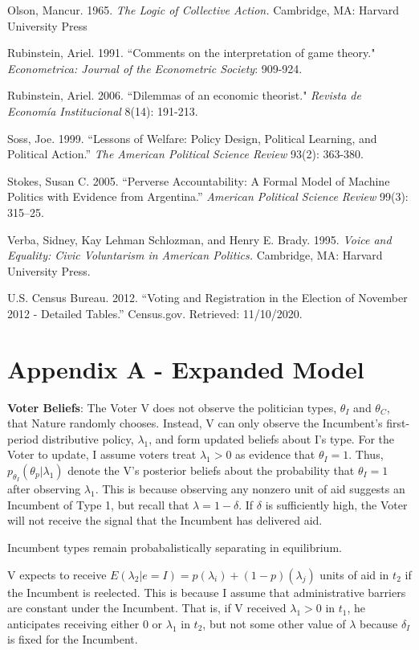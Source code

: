 \documentclass[12pt]{paper}
\begin{document}
\begin{hangparas}{.25in}{1}
Olson, Mancur. 1965. \textit{The Logic of Collective Action.} Cambridge, MA: Harvard University Press

Rubinstein, Ariel. 1991. ``Comments on the interpretation of game theory." \textit{Econometrica: Journal of the Econometric Society}: 909-924.

Rubinstein, Ariel. 2006. ``Dilemmas of an economic theorist." \textit{Revista de Economía Institucional} 8(14): 191-213.

Soss, Joe. 1999. ``Lessons of Welfare: Policy Design, Political Learning, and Political Action.” \textit{The American Political Science Review} 93(2): 363-380.

Stokes, Susan C. 2005. ``Perverse Accountability: A Formal Model of Machine Politics with Evidence from Argentina.” \textit{American Political Science Review } 99(3): 315–25.


Verba, Sidney, Kay Lehman Schlozman, and Henry E. Brady. 1995. \textit{Voice and Equality: Civic Voluntarism in American Politics.} Cambridge, MA: Harvard University Press.

U.S. Census Bureau. 2012. ``Voting and Registration in the Election of November 2012 - Detailed Tables.” Census.gov. Retrieved: 11/10/2020.
\end{hangparas}
\clearpage


\section*{Appendix A - Expanded Model}
\textbf{Voter Beliefs}: The Voter V does not observe the politician types, $\theta_I$ and $\theta_C$, that Nature randomly chooses. Instead, V can only observe the Incumbent's first-period distributive policy,  $\lambda_1$, and form updated beliefs about I’s type.  For the Voter to update, I assume voters treat $\lambda_1 > 0$ as evidence that $\theta_I = 1$. Thus, $p_{\theta_I} (\theta_p | \lambda_1 )$ denote the V’s posterior beliefs about the probability that $\theta_I = 1$ after observing $\lambda_1$. This is because observing any nonzero unit of aid suggests an Incumbent of Type 1, but recall that $\lambda = 1 - \delta$. If $\delta$ is sufficiently high, the Voter will not receive the signal that the Incumbent has delivered aid.

Incumbent types remain probabalistically separating in equilibrium.

V expects to receive $E(\lambda_2 | e=I) = p(\lambda_i) + (1-p)(\lambda_j)$ units of aid in $t_2$ if the Incumbent is reelected. This is because I assume that administrative barriers are constant under the Incumbent. That is, if V received $\lambda_1 > 0$ in $t_1$, he anticipates receiving either $0$ or $\lambda_1$ in $t_2$, but not some other value of $\lambda$ because $\delta_I$ is fixed for the Incumbent.
\end{document}
